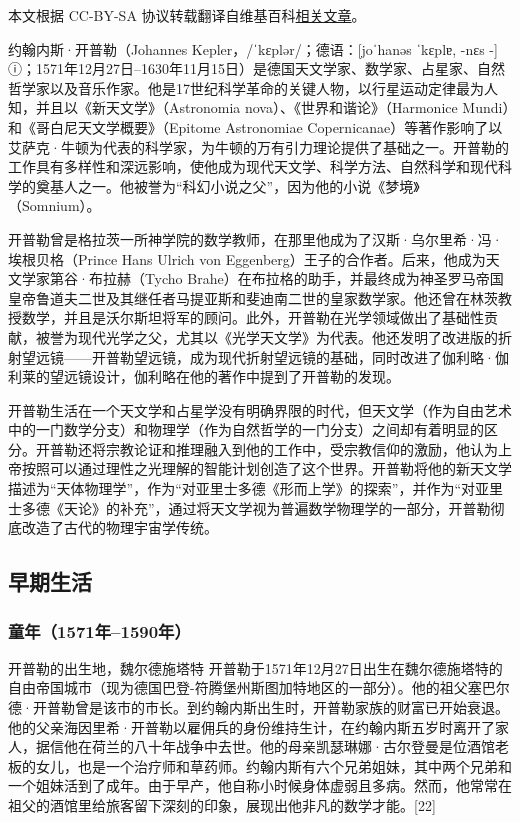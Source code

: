 
本文根据 CC-BY-SA 协议转载翻译自维基百科\href{https://en.wikipedia.org/wiki/Johannes_Kepler}{相关文章}。

约翰内斯·开普勒（Johannes Kepler，/ˈkɛplər/；德语：[joˈhanəs ˈkɛplɐ, -nɛs -] ⓘ；1571年12月27日–1630年11月15日）是德国天文学家、数学家、占星家、自然哲学家以及音乐作家。他是17世纪科学革命的关键人物，以行星运动定律最为人知，并且以《新天文学》（Astronomia nova）、《世界和谐论》（Harmonice Mundi）和《哥白尼天文学概要》（Epitome Astronomiae Copernicanae）等著作影响了以艾萨克·牛顿为代表的科学家，为牛顿的万有引力理论提供了基础之一。开普勒的工作具有多样性和深远影响，使他成为现代天文学、科学方法、自然科学和现代科学的奠基人之一。他被誉为“科幻小说之父”，因为他的小说《梦境》（Somnium）。 

开普勒曾是格拉茨一所神学院的数学教师，在那里他成为了汉斯·乌尔里希·冯·埃根贝格（Prince Hans Ulrich von Eggenberg）王子的合作者。后来，他成为天文学家第谷·布拉赫（Tycho Brahe）在布拉格的助手，并最终成为神圣罗马帝国皇帝鲁道夫二世及其继任者马提亚斯和斐迪南二世的皇家数学家。他还曾在林茨教授数学，并且是沃尔斯坦将军的顾问。此外，开普勒在光学领域做出了基础性贡献，被誉为现代光学之父，尤其以《光学天文学》为代表。他还发明了改进版的折射望远镜——开普勒望远镜，成为现代折射望远镜的基础，同时改进了伽利略·伽利莱的望远镜设计，伽利略在他的著作中提到了开普勒的发现。

开普勒生活在一个天文学和占星学没有明确界限的时代，但天文学（作为自由艺术中的一门数学分支）和物理学（作为自然哲学的一门分支）之间却有着明显的区分。开普勒还将宗教论证和推理融入到他的工作中，受宗教信仰的激励，他认为上帝按照可以通过理性之光理解的智能计划创造了这个世界。开普勒将他的新天文学描述为“天体物理学”，作为“对亚里士多德《形而上学》的探索”，并作为“对亚里士多德《天论》的补充”，通过将天文学视为普遍数学物理学的一部分，开普勒彻底改造了古代的物理宇宙学传统。
\subsection{早期生活}  
\subsubsection{童年（1571年–1590年）}

开普勒的出生地，魏尔德施塔特  
开普勒于1571年12月27日出生在魏尔德施塔特的自由帝国城市（现为德国巴登-符腾堡州斯图加特地区的一部分）。他的祖父塞巴尔德·开普勒曾是该市的市长。到约翰内斯出生时，开普勒家族的财富已开始衰退。他的父亲海因里希·开普勒以雇佣兵的身份维持生计，在约翰内斯五岁时离开了家人，据信他在荷兰的八十年战争中去世。他的母亲凯瑟琳娜·古尔登曼是位酒馆老板的女儿，也是一个治疗师和草药师。约翰内斯有六个兄弟姐妹，其中两个兄弟和一个姐妹活到了成年。由于早产，他自称小时候身体虚弱且多病。然而，他常常在祖父的酒馆里给旅客留下深刻的印象，展现出他非凡的数学才能。[22]